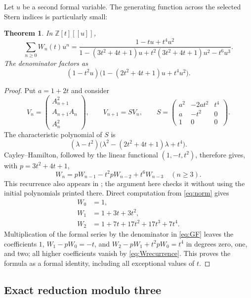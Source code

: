 \documentclass[11pt]{article}
\numberwithin{equation}{section}
\newtheorem{theorem}{Theorem}[section]
\theoremstyle{definition}
\newcommand{\Z}{\mathbb Z}
\begin{document}
Let $u$ be a second formal variable.  The generating function across the
selected Stern indices is particularly small:
\begin{theorem}\label{thm:gf}
In $\Z[t][[u]]$,
\begin{equation}\label{eq:GF}
 \boxed{\quad
 \sum_{n\geq0}W_n(t)u^n
 =\frac{1-tu+t^4u^2}
 {1-(3t^2+4t+1)u+t^2(3t^2+4t+1)u^2-t^6u^3}.
 \quad}
\end{equation}
The denominator factors as
\[
 (1-t^2u)\bigl(1-(2t^2+4t+1)u+t^4u^2\bigr).
\]
\end{theorem}
\begin{proof}
Put $a=1+2t$ and consider
\[
 V_n=\begin{pmatrix}A_{n+1}^2\\A_{n+1}A_n\\A_n^2\end{pmatrix},
 \qquad
 V_{n+1}=S V_n,\qquad
 S=\begin{pmatrix}
 a^2&-2at^2&t^4\\a&-t^2&0\\1&0&0
 \end{pmatrix}.
\]
The characteristic polynomial of $S$ is
\[
 (\lambda-t^2)\bigl(\lambda^2-(2t^2+4t+1)\lambda+t^4\bigr).
\]
Cayley--Hamilton, followed by the linear functional $(1,-t,t^2)$,
therefore gives, with $p=3t^2+4t+1$,
\begin{equation}\label{eq:Wrecurrence}
 W_n=pW_{n-1}-t^2pW_{n-2}+t^6W_{n-3}\quad(n\geq3).
\end{equation}
This recurrence also appears in \cite{Ulas}; the argument here checks it
without using the initial polynomials printed there.
Direct computation from \eqref{eq:norm} gives
\begin{align*}
 W_0&=1,\\
 W_1&=1+3t+3t^2,\\
 W_2&=1+7t+17t^2+17t^3+7t^4.
\end{align*}
Multiplication of the formal series by the denominator in \eqref{eq:GF}
leaves the coefficients $1$, $W_1-pW_0=-t$, and
$W_2-pW_1+t^2pW_0=t^4$ in degrees zero, one, and two; all higher
coefficients vanish by \eqref{eq:Wrecurrence}.  This proves the formula
as a formal identity, including all exceptional values of $t$.
\end{proof}

\subsection{Exact reduction modulo three}
\end{document}
